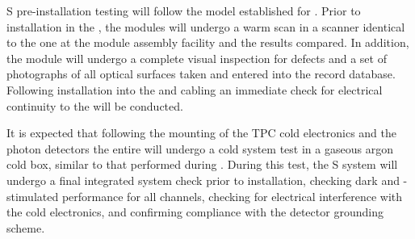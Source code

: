 S pre-installation testing will follow the model established for .  Prior to installation in the , the  modules will undergo a warm scan in a scanner identical to the one at the  module assembly facility and the results compared.  In addition, the module will undergo a complete visual inspection for defects and a set of photographs of all optical surfaces taken and entered into the  record database.  Following installation into the  and cabling an immediate check for electrical continuity to the  will be conducted.

It is expected that following the mounting of the TPC cold electronics and the photon detectors the entire  will undergo a cold system test in a gaseous argon cold box, similar to that performed during .  During this test, the S system will undergo a final integrated system check prior to installation, checking dark and -stimulated  performance for all channels, checking for electrical interference with the cold electronics, and confirming compliance with the detector grounding scheme.
